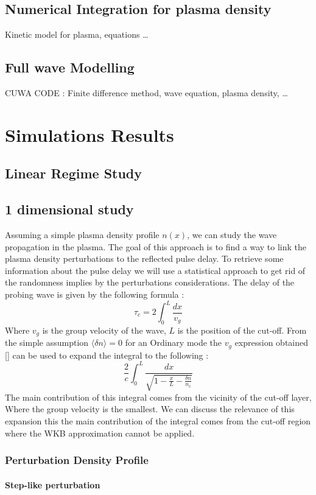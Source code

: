 \documentclass[11pt,a4paper]{report}
\begin{document}
\begin{multicols}{2}
    \section{Numerical Integration for plasma density}
    Kinetic model for plasma, equations \dots
    \section{Full wave Modelling}
    CUWA CODE : Finite difference method, wave equation, plasma density, \dots

    \chapter{Simulations Results}
    \section{Linear Regime Study}
    \section{1 dimensional study}
    Assuming a simple plasma density profile $n(x)$, we can study the wave propagation in the plasma. The goal of this approach is to find a way to link the plasma density perturbations to the reflected pulse delay. To retrieve some information about the pulse delay we will
    use a statistical approach to get rid of the randomness implies by the perturbations considerations.
    The delay of the probing wave is given by the following formula  : $$\tau_c = 2 \int_0^L \frac{dx}{v_g}$$ Where $v_g$ is the group velocity of the wave, $L$ is the position of the cut-off.
    From the simple assumption $\langle \delta n \rangle = 0 $ for an Ordinary mode the  $v_g$ expression obtained [] can be used to expand the integral to the following :
    $$\frac{2}{c} \int_0^L \frac{dx}{\sqrt{1 - \frac{x}{L} - \frac{\delta n }{n_c}}}$$ The main contribution of this integral comes from the vicinity of the cut-off layer, Where the group velocity is the smallest.
    We can discuss the relevance of this expansion this the main contribution of the integral comes from the cut-off region where the WKB approximation cannot be applied.

    \subsection{Perturbation Density Profile}
    \subsubsection{Step-like perturbation}

\end{multicols}
\end{document}
